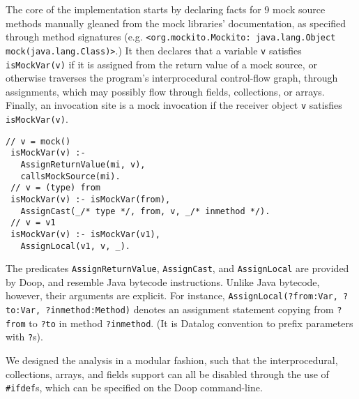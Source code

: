 The core of the implementation starts by declaring facts for 9 mock source methods manually gleaned from the mock libraries' documentation, as specified through method signatures (e.g. 
\texttt{<org.mockito.Mockito: java.lang.Object mock(java.lang.Class)>}.)
It then declares that a variable {\tt v} satisfies \verb+isMockVar(v)+ if it is assigned from the return value of a mock source, or otherwise traverses the program's interprocedural control-flow graph, through assignments, which may possibly flow through fields, collections, or arrays. Finally, an invocation site is a mock invocation if the receiver object {\tt v} satisfies \verb+isMockVar(v)+.

\begin{lstlisting}[basicstyle=\ttfamily\small,numbers=none,label={lst:core}]
 // v = mock()
 isMockVar(v) :-
   AssignReturnValue(mi, v),
   callsMockSource(mi).
 // v = (type) from
 isMockVar(v) :- isMockVar(from),
   AssignCast(_/* type */, from, v, _/* inmethod */).
 // v = v1
 isMockVar(v) :- isMockVar(v1),
   AssignLocal(v1, v, _).
\end{lstlisting}

The predicates \texttt{AssignReturnValue}, \texttt{AssignCast}, and \texttt{AssignLocal} are provided by Doop, and resemble Java bytecode instructions. Unlike Java bytecode, however, their arguments are explicit. For instance, \texttt{AssignLocal(?from:Var, ?to:Var, ?inmethod:Method)} denotes an assignment statement copying from \texttt{?from} to \texttt{?to} in method \texttt{?inmethod}. (It is Datalog convention to prefix parameters with \texttt{?}s).

We designed the analysis in a modular fashion, such that the interprocedural, collections, arrays, and fields support can all be disabled through the use of \verb+#ifdef+s, which can be specified on the Doop command-line.

